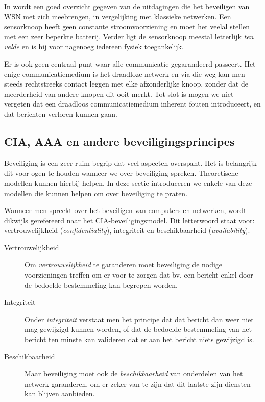 In \citep{dargie2010fundamentals} wordt een goed overzicht gegeven van de
uitdagingen die het beveiligen van WSN met zich meebrengen, in vergelijking met
klassieke netwerken. Een sensorknoop heeft geen constante stroomvoorziening en
moet het veelal stellen met een zeer beperkte batterij. Verder ligt de
sensorknoop meestal letterlijk \emph{ten velde} en is hij voor nagenoeg
iedereen fysiek toegankelijk.

Er is ook geen centraal punt waar alle communicatie gegarandeerd passeert. Het
enige communicatiemedium is het draadloze netwerk en via die weg kan men steeds
rechtstreeks contact leggen met elke afzonderlijke knoop, zonder dat de
meerderheid van andere knopen dit ooit merkt. Tot slot is mogen we niet
vergeten dat een draadloos communicatiemedium inherent fouten introduceert, en
dat berichten verloren kunnen gaan.

\subsection{CIA, AAA en andere beveiligingsprincipes}
\label{subsection:cia}

Beveiliging is een zeer ruim begrip dat veel aspecten overspant. Het is
belangrijk dit voor ogen te houden wanneer we over beveiliging spreken.
Theoretische modellen kunnen hierbij helpen. In deze sectie introduceren we
enkele van deze modellen die kunnen helpen om over beveiliging te praten.

Wanneer men spreekt over het beveiligen van computers en netwerken, wordt
dikwijls gerefereerd naar het CIA-beveiligingsmodel. Dit letterwoord staat
voor: vertrouwelijkheid (\emph{confidentiality}), integriteit en
beschikbaarheid (\emph{availability}).

\begin{description}

  \item[Vertrouwelijkheid] Om \emph{vertrouwelijkheid} te garanderen moet
  beveiliging de nodige voorzieningen treffen om er voor te zorgen dat bv. een
  bericht enkel door de bedoelde bestemmeling kan begrepen worden.
  
  \item[Integriteit] Onder \emph{integriteit} verstaat men het principe dat dat
  bericht dan weer niet mag gewijzigd kunnen worden, of dat de bedoelde
  bestemmeling van het bericht ten minste kan valideren dat er aan het bericht
  niets gewijzigd is. 
  
  \item[Beschikbaarheid] Maar beveiliging moet ook de \emph{beschikbaarheid}
  van onderdelen van het netwerk garanderen, om er zeker van te zijn dat dit
  laatste zijn diensten kan blijven aanbieden.

\end{description}

